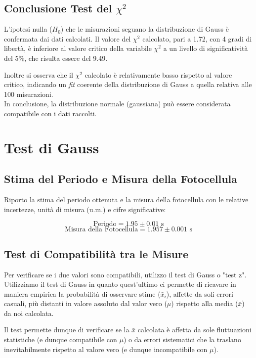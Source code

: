 \documentclass{article}
\begin{document}
\subsection{Conclusione Test del $\chi^2$}
L'ipotesi nulla ($H_0$) che le misurazioni seguano la distribuzione di Gauss è confermata dai dati calcolati. Il valore del $\chi^2$ calcolato, pari a 1.72, con 4 gradi di libertà, è inferiore al valore critico della variabile $\chi^2$ a un livello di significatività del 5\%, che risulta essere del 9.49.

\noindent Inoltre si osserva che il $\chi^2$ calcolato è relativamente basso rispetto al valore critico, indicando un \textit{fit} coerente della distribuzione di Gauss a quella relativa alle 100 misurazioni. 
\\In conclusione, la distribuzione normale (gaussiana) può essere considerata compatibile con i dati raccolti.

\section{Test di Gauss}
\subsection{Stima del Periodo e Misura della Fotocellula}

Riporto la stima del periodo ottenuta e la misura della fotocellula con le relative incertezze, unità di misura (u.m.) e cifre significative:

\[ \text{Periodo} = 1.95 \pm 0.01 \text{ s} \]
\[ \text{Misura della Fotocellula} = 1.957 \pm 0.001 \text{ s} \]

\subsection{Test di Compatibilità tra le Misure}

Per verificare se i due valori sono compatibili, utilizzo il test di Gauss o "test z".\\
Utilizziamo il test di Gauss in quanto quest'ultimo ci permette di ricavare in maniera empirica la probabilità di osservare stime ($\bar{x}_i$), affette da soli errori casuali, più distanti in valore assoluto dal valor vero ($\mu$) rispetto alla media ($\bar{x}$) da noi calcolata. 

Il test permette dunque di verificare se la $\bar{x}$ calcolata è affetta da sole fluttuazioni statistiche (e dunque compatibile con $\mu$) o da errori sistematici che la traslano inevitabilmente rispetto al valore vero (e dunque incompatibile con $\mu$). 
\end{document}
